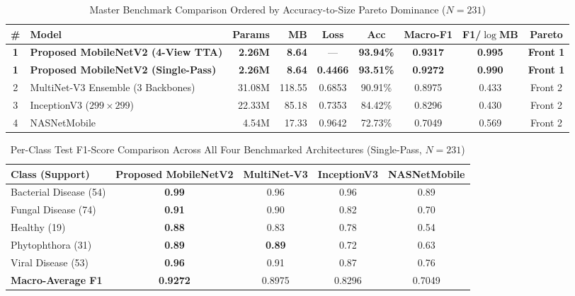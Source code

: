 \begin{table}[htbp]
\caption{Master Benchmark Comparison Ordered by Accuracy-to-Size Pareto Dominance ($N = 231$)}
\label{tab:final_summary}
\begin{center}
\small
\setlength{\tabcolsep}{3.5pt}
\begin{tabularx}{\textwidth}{| c | X | r | r | c | c | c | c | c |}
\hline
\textbf{\#} & \textbf{Model} & \textbf{Params} & \textbf{MB} & \textbf{Loss} & \textbf{Acc} & \textbf{Macro-F1} & \textbf{F1/$\log$MB} & \textbf{Pareto} \\
\hline
\textbf{1} & \textbf{Proposed MobileNetV2 (4-View TTA)} & \textbf{2.26M} & \textbf{8.64} & --- & \textbf{93.94\%} & \textbf{0.9317} & \textbf{0.995} & \textbf{Front 1} \\
\hline
\textbf{1} & \textbf{Proposed MobileNetV2 (Single-Pass)} & \textbf{2.26M} & \textbf{8.64} & \textbf{0.4466} & \textbf{93.51\%} & \textbf{0.9272} & \textbf{0.990} & \textbf{Front 1} \\
\hline
2 & MultiNet-V3 Ensemble (3 Backbones) & 31.08M & 118.55 & 0.6853 & 90.91\% & 0.8975 & 0.433 & Front 2 \\
\hline
3 & InceptionV3 ($299 \times 299$) & 22.33M & 85.18 & 0.7353 & 84.42\% & 0.8296 & 0.430 & Front 2 \\
\hline
4 & NASNetMobile & 4.54M & 17.33 & 0.9642 & 72.73\% & 0.7049 & 0.569 & Front 2 \\
\hline
\end{tabularx}
\end{center}
\end{table}

\begin{table}[htbp]
\caption{Per-Class Test F1-Score Comparison Across All Four Benchmarked Architectures (Single-Pass, $N = 231$)}
\label{tab:per_class_all}
\begin{center}
\setlength{\tabcolsep}{4pt}
\begin{tabularx}{\textwidth}{| >{\raggedright\arraybackslash}X | c | c | c | c |}
\hline
\textbf{Class (Support)} & \textbf{Proposed MobileNetV2} & \textbf{MultiNet-V3} & \textbf{InceptionV3} & \textbf{NASNetMobile} \\
\hline
Bacterial Disease (54) & \textbf{0.99} & 0.96 & 0.96 & 0.89 \\
\hline
Fungal Disease (74) & \textbf{0.91} & 0.90 & 0.82 & 0.70 \\
\hline
Healthy (19) & \textbf{0.88} & 0.83 & 0.78 & 0.54 \\
\hline
Phytophthora (31) & \textbf{0.89} & \textbf{0.89} & 0.72 & 0.63 \\
\hline
Viral Disease (53) & \textbf{0.96} & 0.91 & 0.87 & 0.76 \\
\hline
\textbf{Macro-Average F1} & \textbf{0.9272} & 0.8975 & 0.8296 & 0.7049 \\
\hline
\end{tabularx}
\end{center}
\end{table}


